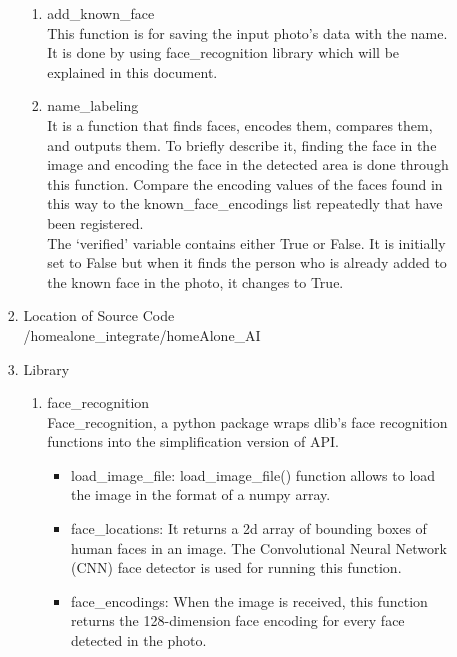 \documentclass[conference]{IEEEtran}
\begin{document}
\begin{enumerate}[label=\arabic*.]
\begin{enumerate}[label=\arabic*.]
\begin{enumerate}[label=\alph*.]
        \begin{enumerate}[label=\roman*.]
            \item{\large{add\_known\_face}}\\
            This function is for saving the input photo’s data with the name. It is done by using face\_recognition library which will be explained in this document. \\
            \item{\large{name\_labeling}}\\
            It is a function that finds faces, encodes them, compares them, and outputs them. To briefly describe it, finding the face in the image and encoding the face in the detected area is done through this function. Compare the encoding values of the faces found in this way to the known\_face\_encodings list repeatedly that have been registered.\\
            The ‘verified’ variable contains either True or False. It is initially set to False but when it finds the person who is already added to the known face in the photo, it changes to True. \\
        \end{enumerate}
        \item{\large{Location of Source Code}}\\
        /homealone\_integrate/homeAlone\_AI\\
        \item{\large{Library}}\\
        \begin{enumerate}[label=\roman*.]
            \item{\large{face\_recognition}}\\
            Face\_recognition, a python package wraps dlib’s face recognition functions into the simplification version of API. \\
            \begin{itemize}
                \item load\_image\_file: load\_image\_file() function allows to load the image in the format of a numpy array.\\
                \item face\_locations: It returns a 2d array of bounding boxes of human faces in an image. The Convolutional Neural Network (CNN) face detector is used for running this function. \\
                \item face\_encodings: When the image is received, this function returns the 128-dimension face encoding for every face detected in the photo. \\

\end{itemize}
\end{enumerate}
\end{enumerate}
\end{enumerate}
\end{enumerate}
\end{document}
